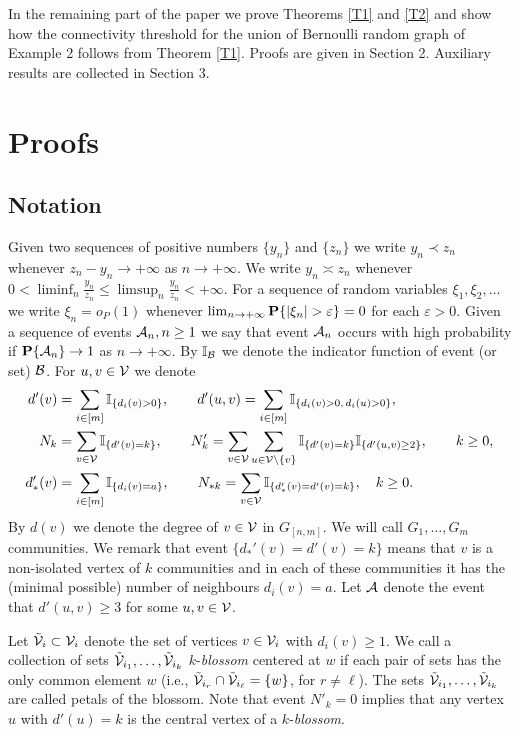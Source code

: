 \documentclass[11pt, a4paper]{article}
\newcommand{\PP}{{\bf{P}}}
\begin{document}
 
 In the remaining part of the paper we prove Theorems \ref{T1} and \ref{T2} and show how the  connectivity threshold for the union of Bernoulli random graph of Example 2 follows from Theorem \ref{T1}. Proofs are given in Section 2. Auxiliary results are collected in Section 3.

\section{Proofs}




\subsection{Notation}

Given two sequences of positive 
numbers $\{y_n\}$ and $\{z_n\}$ we write
$y_n\prec z_n$ whenever $z_n-y_n\to+\infty$ as $n\to+\infty$.
We write $y_n\asymp z_n$ whenever 
$0<\liminf_n\frac{y_n}{z_n}\le \limsup_n\frac{y_n}{z_n}<+\infty$.
For a sequence of random variables $\xi_1,\xi_2,\dots$ we write 
$\xi_n=o_P(1)$ whenever 
$\lim_{n\to+\infty}\PP\{|\xi_n|>\varepsilon\}=0$ for each $\varepsilon>0$.
Given a sequence of events ${\cal A}_n, n\ge 1$ we say 
that event ${\cal A}_n$ occurs with high probability 
if $\PP\{{\cal A}_n\}\to 1$ as $n\to +\infty$. 
By ${\mathbb I}_{\cal B}$ we denote the indicator 
function of event (or set) 
${\cal B}$.
%
%
For $u,v\in {\cal V}$ we denote
\begin{align*}
d'(v)
&
=
\sum_{i\in[m]}{\mathbb I}_{\{d_i(v)>0\}},
\qquad
d'(u,v)=\sum_{i\in[m]}{\mathbb I}_{\{d_i(v)>0,\,
d_i(u)>0\}},
\\
N_k
&
=
\sum_{v\in{\cal V}}{\mathbb I}_{\{d'(v)=k\}},
\qquad
N'_k
=
\sum_{v\in {\cal V}}\sum_{u\in{\cal V}\setminus\{v\}}
{\mathbb  I}_{\{d'(v)= k\}}
{\mathbb  I}_{\{d'(u,v)\ge 2\}},
\qquad
k\ge 0,
\\
d_*'(v)
&
=
\sum_{i\in[m]}
{\mathbb I}_{\{d_i(v)=a\}},
\qquad
N_{*k}
=
\sum_{v\in{\cal V}}
{\mathbb I}_{\{d_*'(v)=d'(v)=k\}},
\quad
k\ge 0.
\end{align*}
By $d(v)$ we denote the degree of  $v\in {\cal V}$ in 
$G_{[n,m]}$.
We will call $G_1,\dots, G_m$ communities. 
We remark that event $\{d_*'(v)=d'(v)=k\}$ means that 
$v$ is a non-isolated vertex of  $k$ communities and in each of these communities it has the 
(minimal possible) number of neighbours  $d_i(v)=a$.
Let ${\cal A}$ denote the event  that
$d'(u,v)\ge 3$ for some $u,v\in {\cal V}$.

Let ${\tilde{\cal V}}_i\subset {\cal V}_i$ denote the 
set of vertices $v\in{\cal V}_i$ with  $d_i(v)\ge 1$.
We call a collection of sets  
${\tilde {\cal V}}_{i_1},\dots, {\tilde{\cal V}}_{i_k}$  
$k$-{\it blossom} 
centered at $w$ if each pair of  sets has 
 the only common element $w$ (i.e., 
${\tilde {\cal V}}_{i_r}\cap{\tilde {\cal V}}_{i_\ell}=\{w\}$, for $r\not=\ell$). The sets 
${\tilde {\cal V}}_{i_1},\dots, {\tilde{\cal V}}_{i_k}$  are called petals of the blossom.
 Note that  event $N'_k=0$ 
implies that any vertex $u$ with $d'(u)=k$ is the central vertex of a $k$-{\it blossom}.
\end{document}
